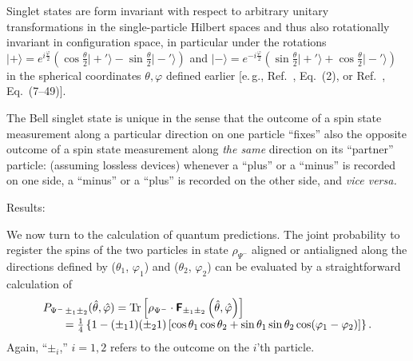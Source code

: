 {Singlet states are form invariant with respect to arbitrary unitary
transformations in the single-particle Hilbert spaces and thus
also rotationally invariant in configuration space,
in particular under the rotations
$
\vert + \rangle =
e^{ i{\frac{\varphi}{2}} }
\left(
\cos \frac{\theta}{2} \vert +'  \rangle
-
\sin \frac{\theta}{2} \vert -'   \rangle
\right)
$
and
$
\vert - \rangle =
e^{ -i{\frac{\varphi}{2}} }
\left(
\sin \frac{\theta}{2} \vert +'   \rangle
+
\cos \frac{\theta}{2} \vert -'  \rangle
\right)
$
in the spherical coordinates $\theta , \varphi$ defined earlier
[e.\,g., Ref.~\cite{krenn1}, Eq.~(2), or Ref.~\cite{ba-89}, Eq.~(7--49)].

The Bell singlet state is unique in the sense that the outcome of a spin state measurement
along a particular direction on one particle ``fixes'' also the opposite outcome of a spin state measurement
along {\em the same} direction on its ``partner'' particle: (assuming lossless devices)
whenever a ``plus'' or a ``minus'' is recorded on one side,
a ``minus'' or a ``plus'' is recorded on the other side, and {\it vice versa.}




{Results:}

We now turn to the calculation of quantum predictions.
The joint probability to register the spins of the two particles
in state $\rho_{{\Psi^-}}$
aligned or antialigned along the directions defined by
($\theta_1$, $\varphi_1 $) and
($\theta_2$, $\varphi_2 $)
can be evaluated by a straightforward calculation of
\begin{equation}
\begin{array}{l}
P_{{ {\Psi^-}}\,\pm_1 \pm_2 } ({\hat \theta},{\hat \varphi} )=
{\rm Tr}\left[\rho_{ {\Psi^-}} \cdot \textsf{\textbf{F}}_{\pm_1 \pm_2 } \left({\hat \theta},{\hat \varphi} \right)\right] \\
\qquad
=\frac{1}{4} \left\{ 1-(\pm_1 1)( \pm_2 1) \left[\cos \theta_1 \cos \theta_2 + \sin \theta_1 \sin \theta_2 \cos (\varphi_1-\varphi_2) \right]\right\}
.
\end{array}
\end{equation}
Again, ``$\pm_i$,'' $i=1,2$ refers to the outcome on the $i$'th particle.

}
